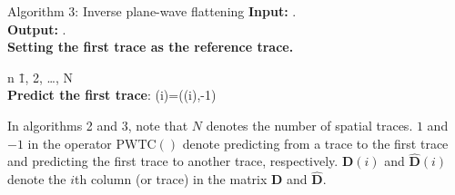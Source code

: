 %

\begin{algorithm}{Algorithm 3: Inverse plane-wave flattening}{}
 \textbf{Input:}  . \\
 \textbf{Output:}  . \\
 \textbf{Setting the first trace as the reference trace.} \\
    \begin{FOR}{n \= 1, 2, \ldots, N} \\
    \textbf{Predict the first trace}: (i)=((i),-1) 
    \end{FOR}
\end{algorithm}

In algorithms 2 and 3, note that $N$ denotes the number of spatial traces. $1$ and $-1$ in the operator $\text{PWTC}()$ denote predicting from a trace to the first trace and predicting the first trace to another trace, respectively. $\mathbf{D}(i)$ and $\hat{\mathbf{D}}(i)$ denote the $i$th column (or trace) in the matrix 
$\mathbf{D}$ and $\hat{\mathbf{D}}$.



